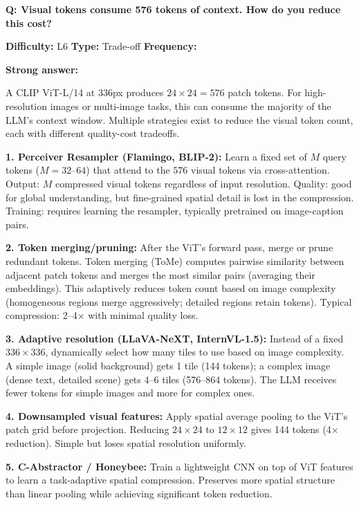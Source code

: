 \begin{interviewq}
\textbf{Q: Visual tokens consume 576 tokens of context. How do you reduce this cost?}

\textbf{Difficulty:} L6 \quad \textbf{Type:} Trade-off \quad \textbf{Frequency:} \freqmed{}

\textbf{Strong answer:}

A CLIP ViT-L/14 at 336px produces $24 \times 24 = 576$ patch tokens. For high-resolution images or multi-image tasks, this can consume the majority of the LLM's context window. Multiple strategies exist to reduce the visual token count, each with different quality-cost tradeoffs.

\textbf{1. Perceiver Resampler (Flamingo, BLIP-2):} Learn a fixed set of $M$ query tokens ($M = 32$--$64$) that attend to the $576$ visual tokens via cross-attention. Output: $M$ compressed visual tokens regardless of input resolution. Quality: good for global understanding, but fine-grained spatial detail is lost in the compression. Training: requires learning the resampler, typically pretrained on image-caption pairs.

\textbf{2. Token merging/pruning:} After the ViT's forward pass, merge or prune redundant tokens. Token merging (ToMe) computes pairwise similarity between adjacent patch tokens and merges the most similar pairs (averaging their embeddings). This adaptively reduces token count based on image complexity (homogeneous regions merge aggressively; detailed regions retain tokens). Typical compression: 2--4$\times$ with minimal quality loss.

\textbf{3. Adaptive resolution (LLaVA-NeXT, InternVL-1.5):} Instead of a fixed $336 \times 336$, dynamically select how many tiles to use based on image complexity. A simple image (solid background) gets 1 tile (144 tokens); a complex image (dense text, detailed scene) gets 4--6 tiles (576--864 tokens). The LLM receives fewer tokens for simple images and more for complex ones.

\textbf{4. Downsampled visual features:} Apply spatial average pooling to the ViT's patch grid before projection. Reducing $24 \times 24$ to $12 \times 12$ gives 144 tokens (4$\times$ reduction). Simple but loses spatial resolution uniformly.

\textbf{5. C-Abstractor / Honeybee:} Train a lightweight CNN on top of ViT features to learn a task-adaptive spatial compression. Preserves more spatial structure than linear pooling while achieving significant token reduction.


\end{interviewq}
